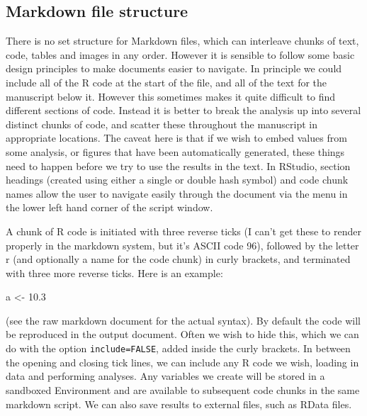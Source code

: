 \documentclass[
]{article}
\newenvironment{Shaded}{\begin{snugshade}}{\end{snugshade}}
\newcommand{\FloatTok}[1]{\textcolor[rgb]{0.00,0.00,0.81}{#1}}
\newcommand{\NormalTok}[1]{#1}
\newcommand{\OtherTok}[1]{\textcolor[rgb]{0.56,0.35,0.01}{#1}}
\begin{document}
\hypertarget{markdown-file-structure}{%
\subsection{Markdown file structure}\label{markdown-file-structure}}

There is no set structure for Markdown files, which can interleave chunks of text, code, tables and images in any order. However it is sensible to follow some basic design principles to make documents easier to navigate. In principle we could include all of the R code at the start of the file, and all of the text for the manuscript below it. However this sometimes makes it quite difficult to find different sections of code. Instead it is better to break the analysis up into several distinct chunks of code, and scatter these throughout the manuscript in appropriate locations. The caveat here is that if we wish to embed values from some analysis, or figures that have been automatically generated, these things need to happen before we try to use the results in the text. In RStudio, section headings (created using either a single or double hash symbol) and code chunk names allow the user to navigate easily through the document via the menu in the lower left hand corner of the script window.

A chunk of R code is initiated with three reverse ticks (I can't get these to render properly in the markdown system, but it's ASCII code 96), followed by the letter r (and optionally a name for the code chunk) in curly brackets, and terminated with three more reverse ticks. Here is an example:

\begin{Shaded}
\begin{Highlighting}[]
\NormalTok{a }\OtherTok{\textless{}{-}} \FloatTok{10.3}
\end{Highlighting}
\end{Shaded}

(see the raw markdown document for the actual syntax). By default the code will be reproduced in the output document. Often we wish to hide this, which we can do with the option \texttt{include=FALSE}, added inside the curly brackets. In between the opening and closing tick lines, we can include any R code we wish, loading in data and performing analyses. Any variables we create will be stored in a sandboxed Environment and are available to subsequent code chunks in the same markdown script. We can also save results to external files, such as RData files.
\end{document}
